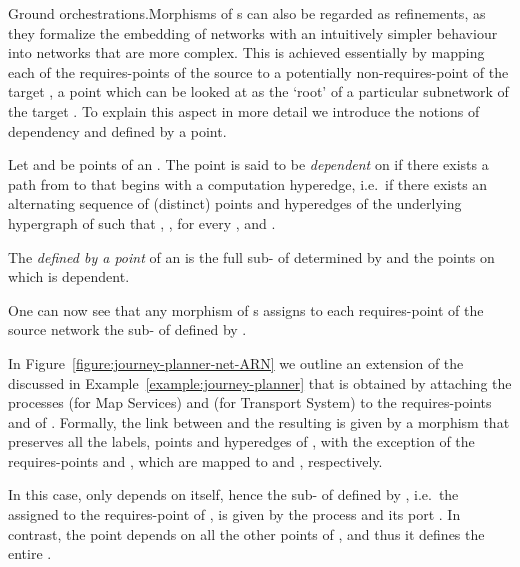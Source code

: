 \documentclass{LMCS}
\begin{document}
  \begin{minisection}{Ground orchestrations.}Morphisms of s can also be regarded as refinements, as they formalize the embedding of networks with an intuitively simpler behaviour into networks that are more complex.  This is achieved essentially by mapping each of the requires-points of the source  to a potentially non-requires-point of the target , a point which can be looked at as the `root' of a particular subnetwork of the target .
    To explain this aspect in more detail we introduce the notions of dependency and  defined by a point.

    \begin{defi}[Dependency]
      Let  and  be points of an  .
      The point  is said to be \emph{dependent} on  if there exists a path from  to  that begins with a computation hyperedge, i.e.\ if there exists an alternating sequence  of (distinct) points and hyperedges of the underlying hypergraph  of  such that , ,  for every , and .
    \end{defi}

    \begin{defi}
      The \emph{ defined by a point}  of an   is the full sub-  of  determined by  and the points on which  is dependent.
    \end{defi}

    One can now see that any morphism of s  assigns to each requires-point  of the source network  the sub-  of  defined by .

    \begin{exa}
      \label{example:journey-planner-net}
      In Figure~\ref{figure:journey-planner-net-ARN} we outline an extension of the   discussed in Example~\ref{example:journey-planner} that is obtained by attaching the processes  (for Map Services) and  (for Transport System) to the requires-points  and  of .
      Formally, the link between  and the resulting   is given by a morphism  that preserves all the labels, points and hyperedges of , with the exception of the requires-points  and , which are mapped to  and , respectively.

      In this case,  only depends on itself, hence the sub- of  defined by , i.e.\ the  assigned to the requires-point  of , is given by the process  and its port .
      In contrast, the point  depends on all the other points of , and thus it defines the entire  .


\end{exa}
\end{minisection}
\end{document}

